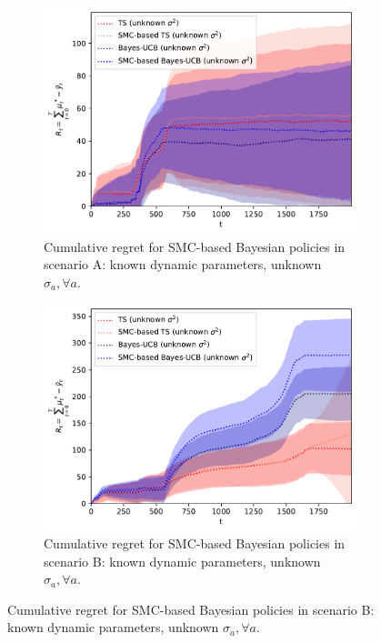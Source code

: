\begin{figure}[!h]
	\begin{subfigure}[b]{0.47\textwidth}
		\includegraphics[width=\textwidth]{./fods_figs/dynamic/linearGaussian/a_M2000_cumulative_regret_dknown_unknownsigma}
		\caption{Cumulative regret for SMC-based Bayesian policies in scenario A: known dynamic parameters, unknown $\sigma_a, \forall a$.}
		\label{fig:dynamic_bandits_linearGaussian_a_cstatic_dknown_unknownsigma}
	\end{subfigure}\qquad
	\begin{subfigure}[b]{0.47\textwidth}
		\includegraphics[width=\textwidth]{./fods_figs/dynamic/linearGaussian/b_M2000_cumulative_regret_dknown_unknownsigma}
		\caption{Cumulative regret for SMC-based Bayesian policies in scenario B: known dynamic parameters, unknown $\sigma_a, \forall a$.}
		\label{fig:dynamic_bandits_linearGaussian_b_cstatic_dknown_unknownsigma}
	\end{subfigure}
	

\end{figure}
